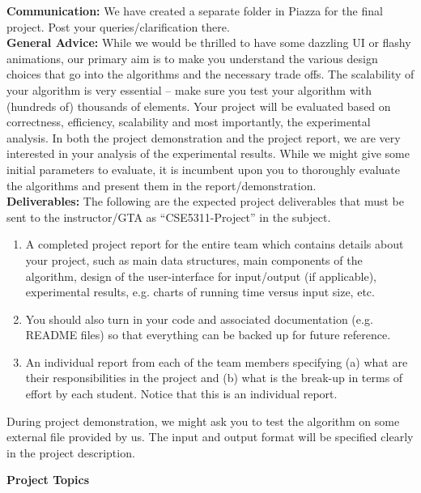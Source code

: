 \documentclass[12pt]{article}
\begin{document}
{\bf Communication:} We have created a separate folder in Piazza for the final project. Post your queries/clarification there. \\

{\bf General Advice:} While we would be thrilled to have some dazzling UI or flashy animations, our primary aim is to make you understand the various design choices that go into the algorithms and the necessary trade offs. The scalability of your algorithm is very essential – make sure you test your algorithm with (hundreds of) thousands of elements. Your project will be evaluated based on correctness, efficiency, scalability and most importantly, the experimental analysis.  In both the project demonstration and the project report, we are very interested in your analysis of the experimental results. While we might give some initial parameters to evaluate, it is incumbent upon you to thoroughly evaluate the algorithms and present them in the report/demonstration. \\

{\bf Deliverables:} 
The following are the expected project deliverables that must be sent to the instructor/GTA as ``CSE5311-Project'' in the subject.

\begin{enumerate}
\item A completed project report for the entire team which contains details about your project, such as main data structures, main components of the algorithm, design of the user-interface for input/output (if applicable), experimental results, e.g. charts of running time versus input size, etc. 
\item You should also turn in your code and associated documentation (e.g. README files) so that everything can be backed up for future reference.
\item An individual report from each of the team members specifying (a) what are their responsibilities in the project and (b) what is the break-up in terms of effort by each student. Notice that this is an individual report.
\end{enumerate}

During project demonstration, we might ask you to test the algorithm on some external file provided by us. The input and output format will be specified clearly in the project description. 

\clearpage
\begin{center} \Large {\bf Project Topics} \end{center}
\end{document}
